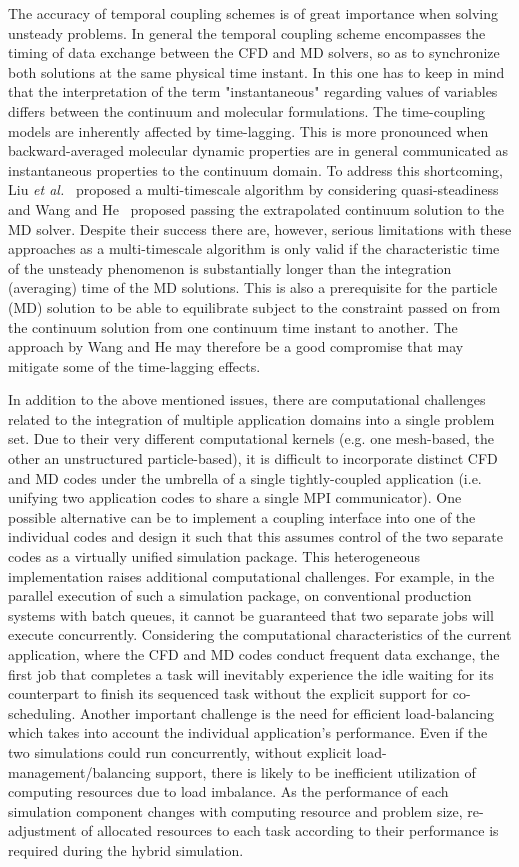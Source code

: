 \documentclass[preprint,12pt]{elsarticle}
\begin{document}
The accuracy of temporal coupling schemes is of great importance when solving unsteady problems. In general the temporal coupling scheme encompasses the timing of data exchange between the CFD and MD solvers, so as to synchronize both solutions at the same physical time instant. In this one has to keep in mind that the interpretation of the term "instantaneous" regarding values of variables differs between the continuum and molecular formulations. The time-coupling models are inherently affected by time-lagging. This is more pronounced when backward-averaged molecular dynamic properties are in general communicated as instantaneous properties to the continuum domain. To address this shortcoming, Liu {\it{et al.}}~\cite{Liu} proposed a multi-timescale algorithm by considering quasi-steadiness and Wang and He~\cite{Wang} proposed passing the extrapolated continuum solution to the MD solver. Despite their success there are, however, serious limitations with these approaches as a multi-timescale algorithm is only valid if the characteristic time of the unsteady phenomenon is substantially longer than the integration (averaging) time of the MD solutions. This is also a prerequisite for the particle (MD) solution to be able to equilibrate subject to the constraint passed on from the continuum solution from one continuum time instant to another. The approach by Wang and He may therefore be a good compromise that may mitigate some of the time-lagging effects.


In addition to the above mentioned issues, there are computational challenges related to the integration of multiple application domains into a single problem set. Due to their very different computational kernels (e.g. one mesh-based, the other an unstructured particle-based), it is difficult to incorporate distinct CFD and MD codes under the umbrella of a single tightly-coupled application (i.e. unifying two application codes to share a single MPI communicator). One possible alternative can be to implement a coupling interface into one of the individual codes and design it such that this assumes control of the two separate codes as a virtually unified simulation package. This heterogeneous implementation raises additional computational challenges. For example, in the parallel execution of such a simulation package, on conventional production systems with batch queues, it cannot be guaranteed that two separate jobs will execute concurrently. Considering the computational characteristics of the current application, where the CFD and MD codes conduct frequent data exchange, the first job that completes a task will inevitably experience the idle waiting for its counterpart to finish its sequenced task without the explicit support for co-scheduling. Another important challenge is the need for efficient load-balancing which takes into account the individual application's performance. Even if the two simulations could run concurrently, without explicit load-management/balancing support, there is likely to be inefficient utilization of computing resources due to load imbalance. As the performance of each simulation component changes with computing resource and problem size, re-adjustment of allocated resources to each task according to their performance is required during the hybrid simulation.
\end{document}
